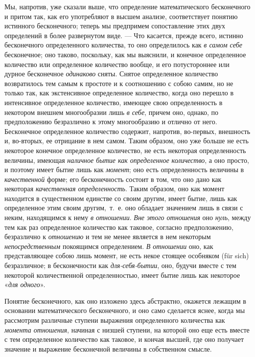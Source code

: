 Мы, напротив, уже сказали выше, что определение математического бесконечного
и притом так, как его употребляют в высшем анализе, соответствует понятию
истинного бесконечного; теперь мы предпримем сопоставление этих двух
определений в более развернутом виде. — Что касается, прежде всего, истинно
бесконечного определенного количества, то оно определилось как
{\em в самом себе} бесконечное; оно таково, поскольку,
как мы выяснили, и конечное определенное количество или определенное
количество вообще, и его потустороннее или дурное бесконечное
{\em одинаково} сняты. Снятое определенное количество
возвратилось тем самым к простоте и к соотношению с собою самим, но не
только так, как экстенсивное определенное количество, когда оно перешло в
интенсивное определенное количество, имеющее свою определенность в
некотором внешнем многообразии лишь {\em в себе},
причем оно, однако, по предположению безразлично к этому многообразию и
отлично от него. Бесконечное определенное количество содержит, напротив,
во-первых, внешность и, во-вторых, ее отрицание в нем самом. Таким образом,
оно уже больше не есть некоторое конечное определенное количество, не есть
некоторая определенность величины, имеющая
{\em наличное бытие как определенное количество}, а оно
просто, и поэтому имеет бытие лишь как {\em момент};
оно есть определенность величины в {\em качественной}
форме; его бесконечность состоит в том, что оно дано как некоторая
{\em качественная определенность}. Таким образом, оно
как момент находится в существенном единстве со своим другим, имеет бытие,
лишь как определенное этим своим другим,~т.~е. оно обладает значением лишь
в связи с неким, находящимся к нему {\em в отношении}.
{\em Вне этого отношения} оно
{\em нуль}, между тем как раз определенное количество
как таковое, согласно предположению, безразлично к
{\em отношению} и тем не менее является в нем некоторым
{\em непосредственным} покоящимся определением.
{\em В отношении} оно, как представляющее собою лишь
момент, не есть некое стоящее особняком (für sich) безразличное; в
бесконечности как {\em для-себя-бытии}, оно, будучи
вместе с тем некоторой количественной определенностью, имеет бытие лишь как
некоторое «{\em для одного}».

Понятие бесконечного, как оно изложено здесь абстрактно, окажется лежащим в
основании математического бесконечного, и оно само сделается яснее, когда
мы рассмотрим различные ступени выражения определенного количества как
{\em момента отношения}, начиная с низшей ступени, на
которой оно еще есть вместе с тем определенное количество как таковое, и
кончая высшей, где оно получает значение и выражение бесконечной величины в
собственном смысле.

